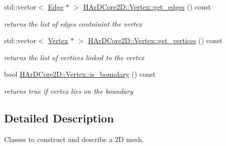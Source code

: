 \begin{DoxyCompactItemize}
\mbox{\label{group__Mesh_ga4a43457a0b69df1db3f3892824c272bb}} 
std\+::vector$<$ \hyperlink{classHArDCore2D_1_1Edge}{Edge} $\ast$ $>$ \hyperlink{group__Mesh_ga4a43457a0b69df1db3f3892824c272bb}{H\+Ar\+D\+Core2\+D\+::\+Vertex\+::get\+\_\+edges} () const
\begin{DoxyCompactList}\small\item\em returns the list of edges containint the vertex \end{DoxyCompactList}\item 
\mbox{\label{group__Mesh_ga67a622b04ce68250a53bc0825487bb6e}} 
std\+::vector$<$ \hyperlink{classHArDCore2D_1_1Vertex}{Vertex} $\ast$ $>$ \hyperlink{group__Mesh_ga67a622b04ce68250a53bc0825487bb6e}{H\+Ar\+D\+Core2\+D\+::\+Vertex\+::get\+\_\+vertices} () const
\begin{DoxyCompactList}\small\item\em returns the list of vertices linked to the vertex \end{DoxyCompactList}\item 
\mbox{\label{group__Mesh_gaea5f04b0b268e3de29d3de7d9034b4fc}} 
bool \hyperlink{group__Mesh_gaea5f04b0b268e3de29d3de7d9034b4fc}{H\+Ar\+D\+Core2\+D\+::\+Vertex\+::is\+\_\+boundary} () const
\begin{DoxyCompactList}\small\item\em returns true if vertex lies on the boundary \end{DoxyCompactList}\end{DoxyCompactItemize}


\subsection{Detailed Description}
Classes to construct and describe a 2D mesh. 

